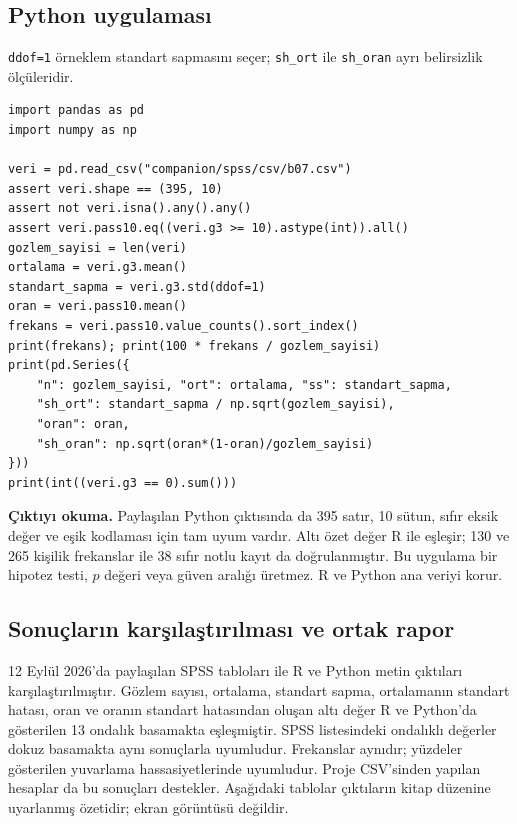 \par\noindent\begin{minipage}{\linewidth}
\subsection{Python uygulaması}
\label{sec:python-b07}

\texttt{ddof=1} örneklem standart sapmasını seçer; \texttt{sh\_ort} ile \texttt{sh\_oran} ayrı belirsizlik ölçüleridir.

\begin{lstlisting}[style=prismPythonApp]
import pandas as pd
import numpy as np

veri = pd.read_csv("companion/spss/csv/b07.csv")
assert veri.shape == (395, 10)
assert not veri.isna().any().any()
assert veri.pass10.eq((veri.g3 >= 10).astype(int)).all()
gozlem_sayisi = len(veri)
ortalama = veri.g3.mean()
standart_sapma = veri.g3.std(ddof=1)
oran = veri.pass10.mean()
frekans = veri.pass10.value_counts().sort_index()
print(frekans); print(100 * frekans / gozlem_sayisi)
print(pd.Series({
    "n": gozlem_sayisi, "ort": ortalama, "ss": standart_sapma,
    "sh_ort": standart_sapma / np.sqrt(gozlem_sayisi),
    "oran": oran,
    "sh_oran": np.sqrt(oran*(1-oran)/gozlem_sayisi)
}))
print(int((veri.g3 == 0).sum()))
\end{lstlisting}

\textbf{Çıktıyı okuma.} Paylaşılan Python çıktısında da 395 satır,
10 sütun, sıfır eksik değer ve eşik kodlaması için tam uyum vardır.
Altı özet değer R ile eşleşir; 130 ve 265 kişilik frekanslar ile
38 sıfır notlu kayıt da doğrulanmıştır. Bu uygulama bir hipotez testi,
$p$ değeri veya güven aralığı üretmez. R ve Python ana veriyi korur.
\end{minipage}\par

\subsection{Sonuçların karşılaştırılması ve ortak rapor}
12 Eylül 2026'da paylaşılan SPSS tabloları ile R ve Python metin
çıktıları karşılaştırılmıştır. Gözlem sayısı, ortalama, standart sapma,
ortalamanın standart hatası, oran ve oranın standart hatasından oluşan
altı değer R ve Python'da gösterilen 13 ondalık basamakta eşleşmiştir.
SPSS listesindeki ondalıklı değerler dokuz basamakta aynı sonuçlarla
uyumludur. Frekanslar aynıdır; yüzdeler gösterilen yuvarlama
hassasiyetlerinde uyumludur. Proje CSV'sinden yapılan hesaplar da
bu sonuçları destekler. Aşağıdaki tablolar çıktıların kitap düzenine
uyarlanmış özetidir; ekran görüntüsü değildir.

